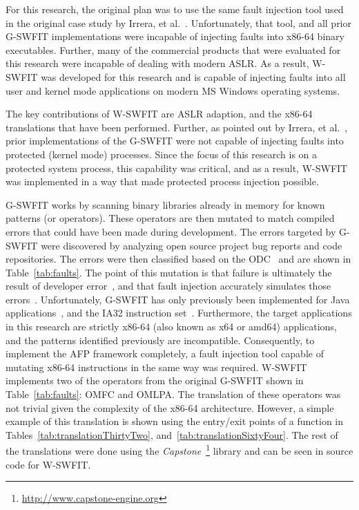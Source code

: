 For this research, the original plan was to use the same fault injection tool
used in the original case study by Irrera, et al.~\cite{irrera2015}.
Unfortunately, that tool, and all prior \ac{G-SWFIT} implementations were
incapable of injecting faults into x86-64 binary executables.  Further, many of
the commercial products that were evaluated for this research were incapable of
dealing with modern \ac{ASLR}.  As a result, \ac{W-SWFIT} was developed for
this research and is capable of injecting faults into all user and kernel mode
applications on modern \ac{MS} Windows operating systems.  

The key contributions of \ac{W-SWFIT} are \ac{ASLR} adaption, and the x86-64
translations that have been performed.  Further, as pointed out by Irrera, et
al.~\cite{irrera2013a}, prior implementations of the \ac{G-SWFIT} were not
capable of injecting faults into protected (kernel mode) processes.  Since the
focus of this research is on a protected system process, this capability was
critical, and as a result, \ac{W-SWFIT} was implemented in a way that made
protected process injection possible.  

\tabFaults

\ac{G-SWFIT} works by scanning binary libraries already in memory for known
patterns (or operators).  These operators are then mutated to match compiled
errors that could have been made during development.  The errors targeted by
\ac{G-SWFIT} were discovered by analyzing open source project bug reports and
code repositories.  The errors were then classified based on the
\ac{ODC}~\cite{bridge1998} and are shown in Table~\ref{tab:faults}.  The point
of this mutation is that failure is ultimately the result of developer
error~\cite{irrera2015,salfnerSurvey}, and that fault injection accurately
simulates those errors~\cite{gswfit}.  Unfortunately, \ac{G-SWFIT} has only
previously been implemented for Java
applications~\cite{martins2002jaca,sanches2011jswfit}, and the IA32 instruction
set~\cite{gswfit,natella2010}.  Furthermore, the target applications in this
research are strictly x86-64 (also known as x64 or amd64) applications, and the
patterns identified previously are incompatible.  Consequently, to implement
the \ac{AFP} framework completely, a fault injection tool capable of mutating
x86-64 instructions in the same way was required.  \ac{W-SWFIT} implements two
of the operators from the original \ac{G-SWFIT} shown in
Table~\ref{tab:faults}: OMFC and OMLPA.  The translation of these operators was
not trivial given the complexity of the x86-64 architecture.  However, a simple
example of this translation is shown using the entry/exit points of a function
in Tables~\ref{tab:translationThirtyTwo}, and~\ref{tab:translationSixtyFour}.
The rest of the translations were done using the
\emph{Capstone}~\footnote{\url{http://www.capstone-engine.org}} library and can
be seen in source code for \ac{W-SWFIT}.

